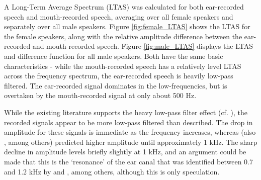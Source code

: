 A Long-Term Average Spectrum (LTAS) was calculated for both ear-recorded speech and mouth-recorded speech, averaging over all female speakers and separately over all male speakers.  Figure \ref{fig:female_LTAS} shows the LTAS for the female speakers, along with the relative amplitude difference between the ear-recorded and mouth-recorded speech.  Figure \ref{fig:male_LTAS} displays the LTAS and difference function for all male speakers.  Both have the same basic characteristics - while the mouth-recorded speech has a relatively level LTAS across the frequency spectrum, the ear-recorded speech is heavily low-pass filtered.  The ear-recorded signal dominates in the low-frequencies, but is overtaken by the mouth-recorded signal at only about 500 Hz.

While the existing literature supports the heavy low-pass filter effect (cf. \cite{stenfelt:07,reinfeldt:10}), the recorded signals appear to be more low-pass filtered than described.  The drop in amplitude for these signals is immediate as the frequency increases, whereas \cite{hansen:97b} (also \cite{wimmer:86,may:92,thorup:96}, among others) predicted higher amplitude until approximately 1 kHz.  The sharp decline in amplitude levels briefly slightly at 1 kHz, and an argument could be made that this is the `resonance' of the ear canal that was identified between 0.7 and 1.2 kHz by \cite{porschmann:00} and \cite{hakansson:94}, among others, although this is only speculation.  %


